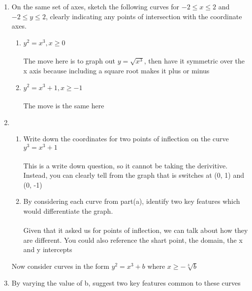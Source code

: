 \documentclass[../main.tex]{subfiles}
\begin{document}
\begin{enumerate}

    \item On the same set of axes, sketch the following curves for $ -2 \leq x \leq 2$ and $-2 \leq y \leq 2$, clearly indicating any points of intersection with the coordinate axes.
    \begin{enumerate}
        \item $y^2 = x^3, x \geq 0$ \\
            \\
            
            The move here is to graph out $y = \sqrt{x^3}$, then have it symmetric over the x axis because including a square root makes it plus or minus
            \\
        \item $y^2 = x^3 +1, x \geq -1$  \\
           \\ 
            The move is the same here
            \\
    \end{enumerate}

    \item 
    \begin{enumerate}

        \item Write down the coordinates for two points of inflection on the curve $y^3 = x^3 +1$ \\ 
            \\ 
            This is a write down question, so it cannot be taking the derivitive. Instead, you can clearly tell from the graph that is switches at (0, 1) and (0, -1)
            \\
        \item By considering each curve from part(a), identify two key features which would differentiate the graph.
            \\ 
            \\ 
            Given that it asked us for points of inflection, we can talk about how they are different. You could also reference the shart point, the domain, the x and y intercepts
            \\ 
    \end{enumerate}
    Now consider curves in the form $y^2 = x^3 + b$ where $x \geq -\sqrt[3]{b}$
    \item By varying the value of b, suggest two key features common to these curves \\
        

\end{enumerate}
\end{document}
